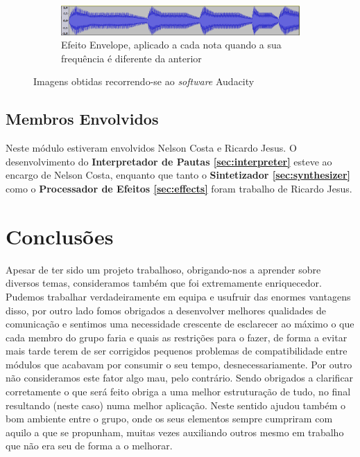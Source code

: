 \documentclass[a4paper,11pt,openright,oneside]{report}
\begin{document}
\begin{figure}
        \begin{subfigure}[b]{1\textwidth}
                \includegraphics[width=\textwidth]{img/Envelope}
                \caption{Efeito Envelope, aplicado a cada nota quando a sua frequência é diferente da anterior}
                \label{fig:envelope}
        \end{subfigure}
        \caption{Imagens obtidas recorrendo-se ao \textit{software} Audacity}\label{fig:effects}
\end{figure}

\section*{Membros Envolvidos}

Neste módulo estiveram envolvidos Nelson Costa e Ricardo Jesus. O desenvolvimento do \textbf{Interpretador de Pautas \ref{sec:interpreter}} esteve ao encargo de Nelson Costa, enquanto que tanto o \textbf{Sintetizador \ref{sec:synthesizer}} como o \textbf{Processador de Efeitos \ref{sec:effects}} foram trabalho de Ricardo Jesus.

\chapter{Conclusões}
\label{chap.conclusões}

Apesar de ter sido um projeto trabalhoso, obrigando-nos a aprender sobre diversos temas, consideramos também que foi extremamente enriquecedor. Pudemos trabalhar verdadeiramente em equipa e usufruir das enormes vantagens disso, por outro lado fomos obrigados a desenvolver melhores qualidades de comunicação e sentimos uma necessidade crescente de esclarecer ao máximo o que cada membro do grupo faria e quais as restrições para o fazer, de forma a evitar mais tarde terem de ser corrigidos pequenos problemas de compatibilidade entre módulos que acabavam por consumir o seu tempo, desnecessariamente. Por outro não consideramos este fator algo mau, pelo contrário. Sendo obrigados a clarificar corretamente o que será feito obriga a uma melhor estruturação de tudo, no final resultando (neste caso) numa melhor aplicação. Neste sentido ajudou também o bom ambiente entre o grupo, onde os seus elementos sempre cumpriram com aquilo a que se propunham, muitas vezes auxiliando outros mesmo em trabalho que não era seu de forma a o melhorar.
\end{document}
